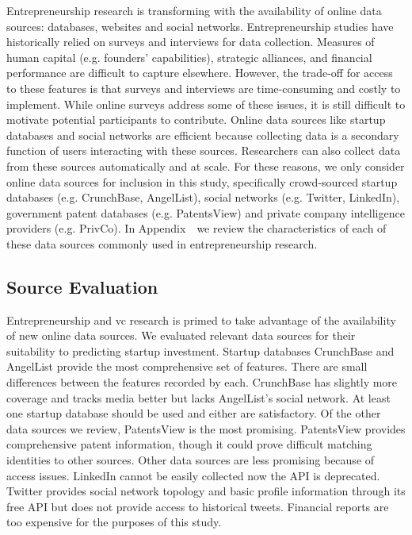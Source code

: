 \documentclass[../thesis/thesis.tex]{subfiles}
\begin{document}
Entrepreneurship research is transforming with the availability of online data sources: databases, websites and social networks. Entrepreneurship studies have historically relied on surveys and interviews for data collection. Measures of human capital (e.g. founders' capabilities), strategic alliances, and financial performance are difficult to capture elsewhere. However, the trade-off for access to these features is that surveys and interviews are time-consuming and costly to implement. While online surveys address some of these issues, it is still difficult to motivate potential participants to contribute. Online data sources like startup databases and social networks are efficient because collecting data is a secondary function of users interacting with these sources. Researchers can also collect data from these sources automatically and at scale. For these reasons, we only consider online data sources for inclusion in this study, specifically crowd-sourced startup databases (e.g. CrunchBase, AngelList), social networks (e.g. Twitter, LinkedIn), government patent databases (e.g. PatentsView) and private company intelligence providers (e.g. PrivCo). In Appendix~\ we review the characteristics of each of these data sources commonly used in entrepreneurship research.

\subsection{Source Evaluation}

Entrepreneurship and \gls{vc} research is primed to take advantage of the availability of new online data sources. We evaluated relevant data sources for their suitability to predicting startup investment. Startup databases CrunchBase and AngelList provide the most comprehensive set of features. There are small differences between the features recorded by each. CrunchBase has slightly more coverage and tracks media better but lacks AngelList's social network. At least one startup database should be used and either are satisfactory. Of the other data sources we review, PatentsView  is the most promising. PatentsView provides comprehensive patent information, though it could prove difficult matching identities to other sources. Other data sources are less promising because of access issues. LinkedIn cannot be easily collected now the API is deprecated. Twitter provides social network topology and basic profile information through its free API but does not provide access to historical tweets. Financial reports are too expensive for the purposes of this study.
\end{document}
